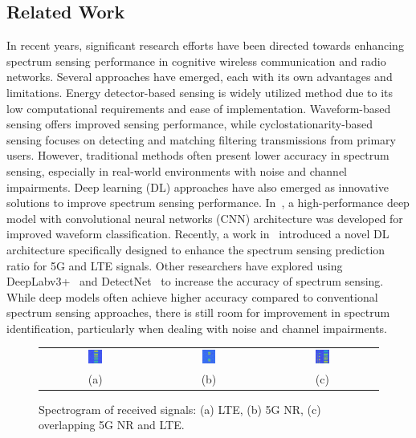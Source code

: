 \documentclass[conference]{IEEEtran} %
\begin{document}
\subsection{Related Work}

In recent years, significant research efforts have been directed towards enhancing spectrum sensing performance in cognitive wireless communication and radio networks. Several approaches have emerged, each with its own advantages and limitations. Energy detector-based sensing is widely utilized method due to its low computational requirements and ease of implementation. Waveform-based sensing offers improved sensing performance, while cyclostationarity-based sensing focuses on detecting and matching filtering transmissions from primary users.
However, traditional methods often present lower accuracy in spectrum sensing, especially in real-world environments with noise and channel impairments.
Deep learning (DL) approaches have also emerged as innovative solutions to improve spectrum sensing performance. In~\cite{huynh2024improved}, a  high-performance deep model with convolutional neural networks (CNN) architecture was developed for improved waveform classification. Recently, a work in~\cite{huynhthe2023intelligence} introduced a novel DL architecture specifically designed to enhance the spectrum sensing prediction ratio for 5G and LTE signals. Other researchers have explored using DeepLabv3+~\cite{nguyen2023accurate} and DetectNet~\cite{gao2019deep} to increase the accuracy of spectrum sensing.
While deep models often achieve higher accuracy compared to conventional spectrum sensing approaches, there is still room for improvement in spectrum identification, particularly when dealing with noise and channel impairments.

\begin{figure}[!t]
    \centering
    \footnotesize
    \begin{tabular}{ccc}
        \includegraphics[width=0.13\textwidth]{img/LTE_frame_0.png}  & \includegraphics[width=0.13\textwidth]{img/NR_frame_1506.png} &
        \includegraphics[width=0.13\textwidth]
        {img/LTE_NR_frame_0.png} 
        \\
        (a) & (b) & (c)
    \end{tabular}
    \caption{Spectrogram of received signals: (a) LTE, (b) 5G NR, (c) overlapping 5G NR and LTE.}
    \label{fig2}
\end{figure}
\end{document}
